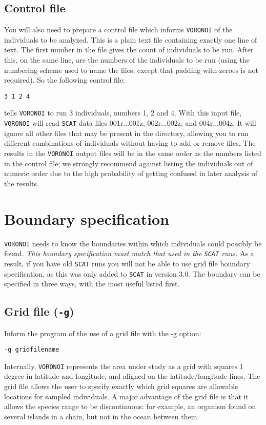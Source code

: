 \documentclass[10pt,titlepage,times,letterpaper]{article}
\def\SCAT{{\tt SCAT} }
\def\VORONOI{{\tt VORONOI} }
\begin{document}
\subsection{Control file}

You will also need to prepare a control file which informs \VORONOI of the
individuals to be analyzed.  This is a plain text file containing exactly one line of
text.  The first number in the file gives the count of individuals to be run.
After this, on the same line, are the numbers of the individuals to be run (using the
numbering scheme used to name the files, except that padding with zeroes is not
required).  So the following control file:

{\tt 3 1 2 4}

tells \VORONOI to run 3 individuals, numbers 1, 2 and 4.  
With this input file, \VORONOI will read \SCAT data files 001r...001z, 002r...002z, and 004r...004z.
It will ignore all other files that may be present in the directory, allowing you to run different 
combinations of individuals without having to add or remove files.  The results in the \VORONOI
output files will be in the same order as the numbers listed in the control file; we strongly
recommend against listing the individuals out of numeric order due to the high probability
of getting confused in later analysis of the results.

\section{Boundary specification}

\VORONOI needs to know the boundaries within which individuals could possibly be found. {\it This boundary
specification must match that used in the \SCAT runs.}  As a result, if you have old \SCAT runs you
will not be able to use grid file boundary specification, as this was only added to \SCAT in version 3.0.
The boundary can be specified in three ways, with the most useful listed first.

\subsection{Grid file ({\tt -g})}

Inform the program of the use of a grid file with the -g option:

\medskip
{\noindent
{\tt -g gridfilename}
}
\medskip

Internally, \VORONOI represents the area under study as a grid with squares 1 degree in latitude
and longitude, and aligned on the latitude/longitude lines.  The grid file allows the user to
specify exactly which grid squares are allowable locations for sampled individuals.  A major
advantage of the grid file is that it allows the species range to be discontinuous:  for example, 
an organism found on several islands in a chain, but not in the ocean between them. 
\end{document}
